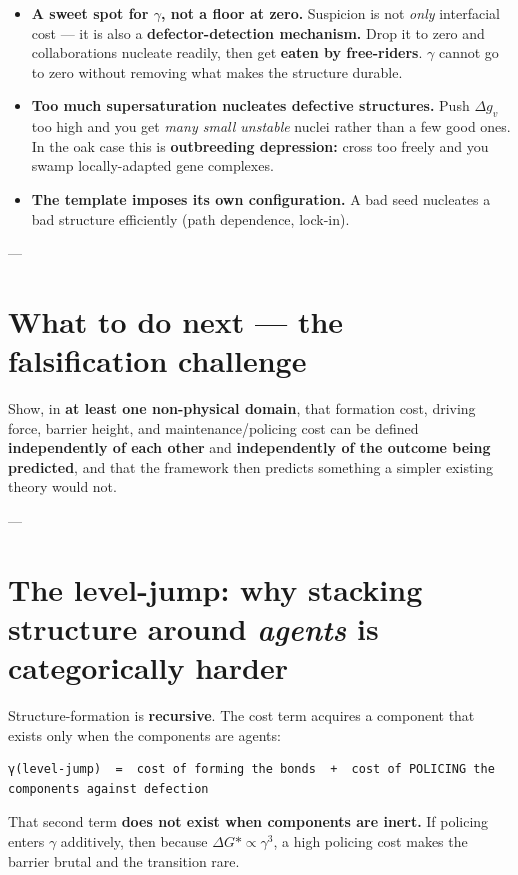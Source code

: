 \documentclass{article}
\begin{document}
\begin{itemize}
    \item \textbf{A sweet spot for $\gamma$, not a floor at zero.} Suspicion is not \textit{only} interfacial cost --- it is also a \textbf{defector-detection mechanism.} Drop it to zero and collaborations nucleate readily, then get \textbf{eaten by free-riders}. $\gamma$ cannot go to zero without removing what makes the structure durable.

    \item \textbf{Too much supersaturation nucleates defective structures.} Push $\Delta g_v$ too high and you get \textit{many small unstable} nuclei rather than a few good ones. In the oak case this is \textbf{outbreeding depression:} cross too freely and you swamp locally-adapted gene complexes.

    \item \textbf{The template imposes its own configuration.} A bad seed nucleates a bad structure efficiently (path dependence, lock-in).
\end{itemize}

---
\section{What to do next --- the falsification challenge}
Show, in \textbf{at least one non-physical domain}, that formation cost, driving force, barrier height, and maintenance/policing cost can be defined \textbf{independently of each other} and \textbf{independently of the outcome being predicted}, and that the framework then predicts something a simpler existing theory would not.

---
\section{The level-jump: why stacking structure around \textit{agents} is categorically harder}
Structure-formation is \textbf{recursive}. The cost term acquires a component that exists only when the components are agents:

\begin{verbatim}
γ(level-jump)  =  cost of forming the bonds  +  cost of POLICING the components against defection
\end{verbatim}

That second term \textbf{does not exist when components are inert.} If policing enters $\gamma$ additively, then because $\Delta G* \propto \gamma^3$, a high policing cost makes the barrier brutal and the transition rare.
\end{document}
